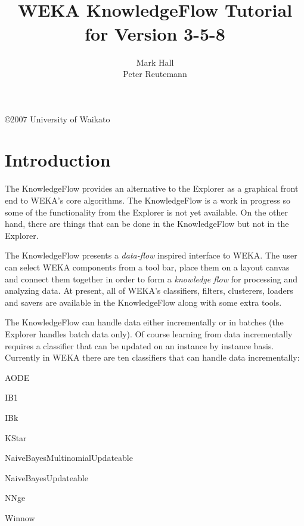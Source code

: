 \documentclass[a4paper]{article}
\title{\epsfig{file=images/coat_of_arms.eps,width=10cm}\vspace{3cm}\\WEKA KnowledgeFlow Tutorial\\for Version 3-5-8}
\author{Mark Hall\\Peter Reutemann}
\newenvironment{tight_itemize}{
\begin{itemize}
  \setlength{\itemsep}{1pt}
  \setlength{\parskip}{0pt}
  \setlength{\parsep}{0pt}}{\end{itemize}
}
\begin{document}
\begin{titlepage}

\maketitle
\thispagestyle{empty}

\center
\vspace{8cm}

\copyright 2007 University of Waikato

\end{titlepage}

\tableofcontents


\newpage
\section{Introduction}

The KnowledgeFlow provides an alternative to the Explorer as a
graphical front end to WEKA's core algorithms. The KnowledgeFlow is a
work in progress so some of the functionality from the Explorer is not
yet available. On the other hand, there are things that can be done in
the KnowledgeFlow but not in the Explorer.

\begin{center}
\end{center}

The KnowledgeFlow presents a \textit{data-flow} inspired interface to
WEKA. The user can select WEKA components from a tool bar, place them
on a layout canvas and connect them together in order to form a
\textit{knowledge flow} for processing and analyzing data. At present, all of
WEKA's classifiers, filters, clusterers, loaders and savers are
available in the KnowledgeFlow along with some extra tools.

The KnowledgeFlow can handle data either incrementally or in batches
(the Explorer handles batch data only). Of course learning from data
incrementally requires a classifier that can be updated on an instance
by instance basis. Currently in WEKA there are ten classifiers that
can handle data incrementally:
\begin{tight_itemize}
	\item AODE
	\item IB1
	\item IBk
	\item KStar
	\item NaiveBayesMultinomialUpdateable
	\item NaiveBayesUpdateable
	\item NNge
	\item Winnow
\end{tight_itemize}
\end{document}
